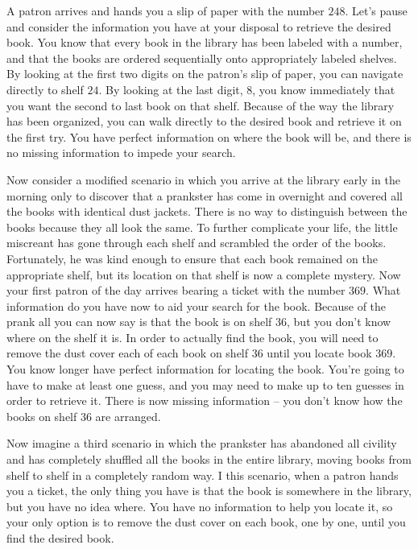 \documentclass[11pt, oneside]{article}   	%
\begin{document}
A patron arrives and hands you a slip of paper with the number $248$. Let's
pause and consider the information you have at your disposal to retrieve the
desired book.  You know that every book in the library has been labeled with a
number, and that the books are ordered sequentially onto appropriately labeled
shelves.  By looking at the first two digits on the patron's slip of paper, you
can navigate directly to shelf $24$.  By looking at the last digit, $8$, you
know immediately that you want the second to last book on that shelf.  Because
of the way the library has been organized, you can walk directly to the desired
book and retrieve it on the first try.  You have perfect information on where
the book will be, and there is no missing information to impede your search.

Now consider a modified scenario in which you arrive at the library early in the
morning only to discover that a prankster has come in overnight and covered all
the books with identical dust jackets.  There is no way to distinguish between
the books because they all look the same.  To further complicate your life, the
little miscreant has gone through each shelf and scrambled the order of the
books.  Fortunately, he was kind enough to ensure that each book remained on the
appropriate shelf, but its location on that shelf is now a complete mystery.
Now your first patron of the day arrives bearing a ticket with the number $369$.
What information do you have now to aid your search for the book.  Because of
the prank all you can now say is that the book is on shelf $36$, but you don't
know where on the shelf it is.  In order to actually find the book, you will
need to remove the dust cover each of each book on shelf $36$ until you locate
book $369$.  You know longer have perfect information for locating the book.
You're going to have to make at least one guess, and you may need to make up to
ten guesses in order to retrieve it.  There is now missing information -- you
don't know how the books on shelf $36$ are arranged.

Now imagine a third scenario in which the prankster has abandoned all civility
and has completely shuffled all the books in the entire library, moving books
from shelf to shelf in a completely random way.  I this scenario, when a patron
hands you a ticket, the only thing you have is that the book is somewhere
in the library, but you have no idea where.  You have no information to help you
locate it, so your only option is to remove the dust cover on each book, one by
one, until you find the desired book.
\end{document}
